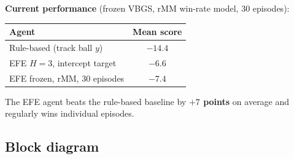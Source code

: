 \documentclass[12pt, a4paper]{article}
\newcommand{\1}{\mathbf{1}}
\begin{document}
\textbf{Current performance} (frozen VBGS, rMM win-rate model, 30 episodes):

\begin{table}[ht]
\centering
\begin{tabular}{lc}
\toprule
Agent & Mean score \\
\midrule
Rule-based (track ball $y$) & $-14.4$ \\
EFE $H=3$, intercept target & $-6.6$ \\
EFE frozen, rMM, 30 episodes & $-7.4$ \\
\bottomrule
\end{tabular}
\end{table}

The EFE agent beats the rule-based baseline by \textbf{$+7$ points} on average
and regularly wins individual episodes.

\subsection{Block diagram}
\label{sec:0.2}
\end{document}
